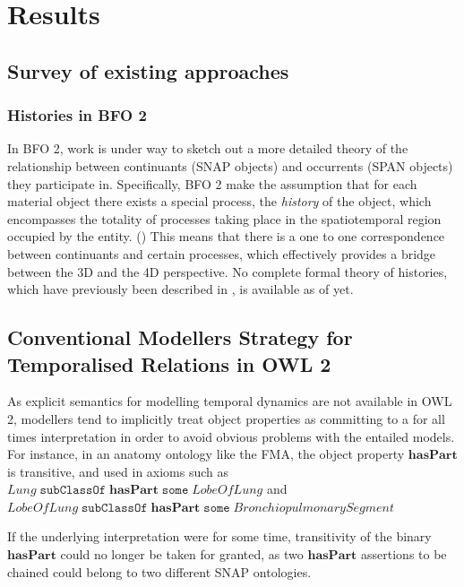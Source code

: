 \documentclass[10pt]{bmc_article}
\newcommand{\mirel}[1]{\ensuremath{\mathrm{\mathbf{#1}}}}
\newcommand{\mclass}[1]{\ensuremath{\mathit{#1}}}
\newenvironment{bmcformat}{\baselineskip20pt\sloppy\setboolean{publ}{false}}{\baselineskip20pt\sloppy}
\begin{document}
\begin{bmcformat}
\section*{Results}

\subsection*{Survey of existing approaches}

\subsubsection*{Histories in BFO 2}




In BFO 2, work is under way to sketch out a more detailed theory of the
relationship between continuants (SNAP objects) and occurrents (SPAN objects) they participate in.
Specifically, BFO 2 make the assumption that for each material object there
exists a special process, the \emph{history} of the object, which encompasses 
the totality of processes taking place in the spatiotemporal region occupied by
the entity. (\cite{BFO2:ref}) This means that there is a one to one correspondence
between continuants 
and certain processes, which effectively
provides a bridge between the 3D and the 4D perspective. No complete formal theory
of histories, which have previously been described in \cite{cornucopia}, is available as of yet.

\subsection{Conventional Modellers Strategy for Temporalised Relations in OWL 2}


As explicit semantics for modelling temporal dynamics are not available in OWL
2, modellers tend to implicitly treat object properties as committing to a 
for all times interpretation in order to avoid obvious problems with the
entailed models. For instance, in an anatomy ontology like the FMA, the object
property \mirel{hasPart} is transitive, and used in axioms such as
$\mclass{Lung}\;\mathtt{subClassOf}\;\mirel{hasPart}\;\mathtt{some}\;\mclass{LobeOfLung}$
and $\mclass{LobeOfLung}\;\mathtt{subClassOf}\;\mirel{hasPart}\;\mathtt{some}\;\mclass{BronchiopulmonarySegment}$

If the underlying interpretation were for some time, transitivity of the
binary \mirel{hasPart} could no longer be taken for granted, as two
\mirel{hasPart} assertions to be chained could belong to two different SNAP
ontologies.


\end{bmcformat}
\end{document}
